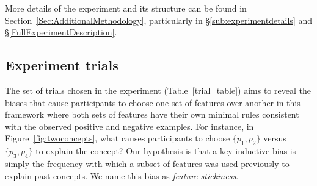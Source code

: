 More details of the experiment and its structure can be found in Section~\ref{Sec:AdditionalMethodology}, particularly in \S\ref{sub:experimentdetails} and \S\ref{FullExperimentDescription}. 

\subsection{Experiment trials}\label{sec:hypothesis}
    The set of trials chosen in the experiment (Table~\ref{trial_table}) aims to reveal the biases that cause participants to choose one set of features over another in this framework where both sets of features have their own minimal rules consistent with the observed positive and negative examples. For instance, in Figure~\ref{fig:twoconcepts}, what causes participants to choose $\{p_1, p_2\}$ versus $\{p_3, p_4\}$ to explain the concept? Our hypothesis is that a key inductive bias is simply the frequency with which a subset of features was used previously to explain past concepts. We name this bias as \textit{feature stickiness}.


\renewcommand{\arraystretch}{1.4}
\newcommand{\marcaEnTabla}{{\bullet}}%



